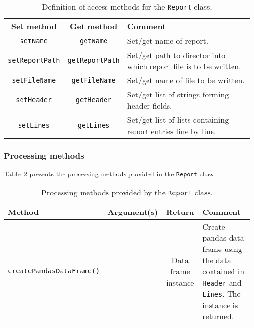 \begin{table}[h]
  \caption{
    Definition of access methods for the \texttt{Report}
    class. 
  }
  \label{Tab:Rprt:AccessMethods}
  \begin{center}
    \begin{tabular}{|c|c|p{9.5cm}|}
      \hline
      \textbf{Set method} & \textbf{Get method}  & \textbf{Comment}                                                       \\
      \hline
      \texttt{setName}       & \texttt{getName}       & Set/get name of report.                                           \\
      \texttt{setReportPath} & \texttt{getReportPath} & Set/get path to director into which report file is to be written. \\
      \texttt{setFileName}   & \texttt{getFileName}   & Set/get name of file to be written.                               \\
      \texttt{setHeader}     & \texttt{getHeader}     & Set/get list of strings forming header fields.                    \\
      \texttt{setLines}      & \texttt{getLines}      & Set/get list of lists containing report entries line by line.     \\
      \hline
    \end{tabular}
  \end{center}
\end{table}

\subsubsection{Processing methods}
\noindent
Table~\ref{Tab:Rprt:ProcMethods} presents the processing methods provided
in the \texttt{Report} class.
\begin{table}[h]
  \caption{
    Processing methods provided by the \texttt{Report}
    class. 
  }
  \label{Tab:Rprt:ProcMethods}
  \begin{center}
    \begin{tabular}{|l|c|c|p{5cm}|}
      \hline
      \textbf{Method} & \textbf{Argument(s)} & \textbf{Return} & \textbf{Comment}                                                       \\
      \hline
      \texttt{createPandasDataFrame()} & & Data frame instance & Create pandas data frame using the data contained in \texttt{Header}
                                                                 and \texttt{Lines}.
                                                                 The instance is returned.                                              \\
      \hline
    \end{tabular}
  \end{center}
\end{table}

